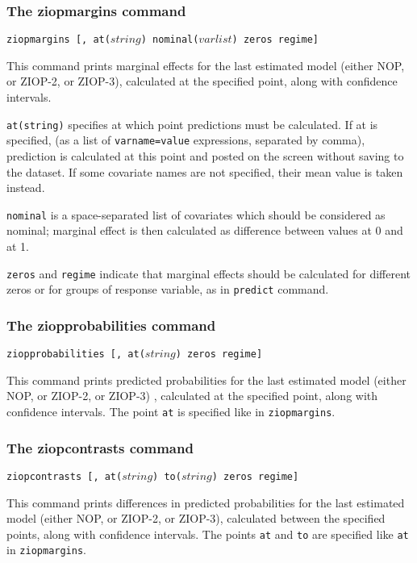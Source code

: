 \documentclass[letterpaper,fleqn,12pt]{article}
\begin{document}
\begin{onehalfspace}
\subsubsection*{The ziopmargins command}

\texttt{ziopmargins [, at($string$) nominal($varlist$) zeros regime]}

This command prints marginal effects for the last estimated model (either
NOP, or ZIOP-2, or ZIOP-3), calculated at the specified point, along with
confidence intervals.

\texttt{at(string)} specifies at which point predictions must be calculated.
If at is specified, (as a list of \texttt{varname=value} expressions,
separated by comma), prediction is calculated at this point and posted on
the screen without saving to the dataset. If some covariate names are not
specified, their mean value is taken instead.

\texttt{nominal} is a space-separated list of covariates which should be
considered as nominal; marginal effect is then calculated as difference
between values at 0 and at 1.

\texttt{zeros} and \texttt{regime} indicate that marginal effects should be
calculated for different zeros or for groups of response variable, as in 
\texttt{predict} command.

\subsubsection*{The ziopprobabilities command}

\texttt{ziopprobabilities [, at($string$) zeros regime]}

This command prints predicted probabilities for the last estimated model
(either NOP, or ZIOP-2, or ZIOP-3) , calculated at the specified point,
along with confidence intervals. The point \texttt{at} is specified like in 
\texttt{ziopmargins}.

\subsubsection*{The ziopcontrasts command}

\texttt{ziopcontrasts [, at($string$) to($string$) zeros regime] }

This command prints differences in predicted probabilities for the last
estimated model (either NOP, or ZIOP-2, or ZIOP-3), calculated between the
specified points, along with confidence intervals. The points \texttt{at}
and \texttt{to} are specified like \texttt{at} in \texttt{ziopmargins}.


\end{onehalfspace}
\end{document}
